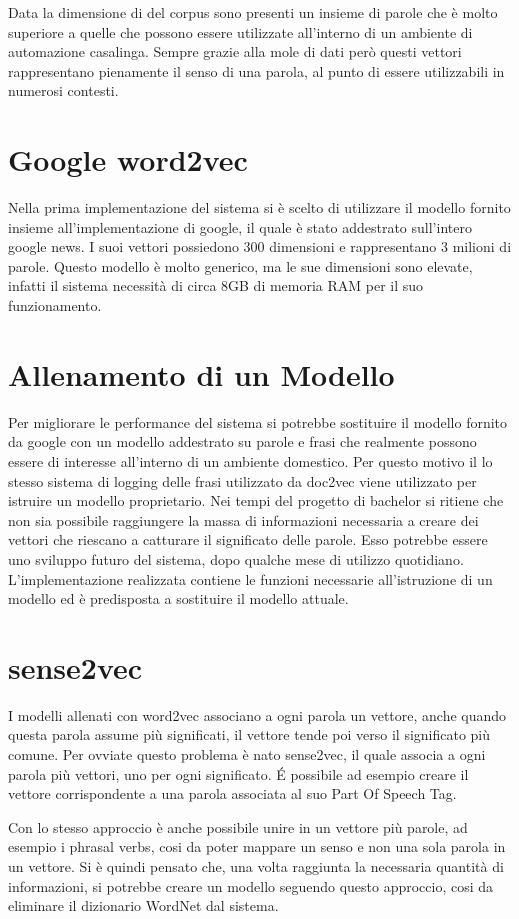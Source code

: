 \documentclass[twoside]{supsistudent}
\begin{document}
Data la dimensione di del corpus sono presenti un insieme di parole che è molto superiore a quelle che possono essere utilizzate all'interno di un ambiente di automazione casalinga. Sempre grazie alla mole di dati però questi vettori rappresentano pienamente il senso di una parola, al punto di essere utilizzabili in numerosi contesti.
\section{Google word2vec}
Nella prima implementazione del sistema si è scelto di utilizzare il modello fornito insieme all'implementazione di google, il quale è stato addestrato sull'intero google news. I suoi vettori possiedono 300 dimensioni e rappresentano 3 milioni di parole. Questo modello è molto generico, ma le sue dimensioni sono elevate, infatti il sistema necessità di circa 8GB di memoria RAM per il suo funzionamento.
\section{Allenamento di un Modello}
Per migliorare le performance del sistema si potrebbe sostituire il modello fornito da google con un modello addestrato su parole e frasi che realmente possono essere di interesse all'interno di un ambiente domestico. Per questo motivo il lo stesso sistema di logging delle frasi utilizzato da doc2vec viene utilizzato per istruire un modello proprietario. Nei tempi del progetto di bachelor si ritiene che non sia possibile raggiungere la massa di informazioni necessaria a creare dei vettori che riescano a catturare il significato delle parole. Esso potrebbe essere uno sviluppo futuro del sistema, dopo qualche mese di utilizzo quotidiano. L'implementazione realizzata contiene le funzioni necessarie all'istruzione di un modello ed è predisposta a sostituire il modello attuale.
\section{sense2vec}
I modelli allenati con word2vec associano a ogni parola un vettore, anche quando questa parola assume più significati, il vettore tende poi verso il significato più comune. Per ovviate questo problema è nato sense2vec, il quale associa a ogni parola più vettori, uno per ogni significato. É possibile ad esempio creare il vettore corrispondente a una parola associata al suo Part Of Speech Tag.  \cite{posCategories} \cite{sense2vec} 

Con lo stesso approccio è anche possibile unire in un vettore più parole, ad esempio i phrasal verbs, cosi da poter mappare un senso e non una sola parola in un vettore. Si è quindi pensato che, una volta raggiunta la necessaria quantità di informazioni, si potrebbe creare un modello seguendo questo approccio, cosi da eliminare il dizionario WordNet dal sistema.
\end{document}
